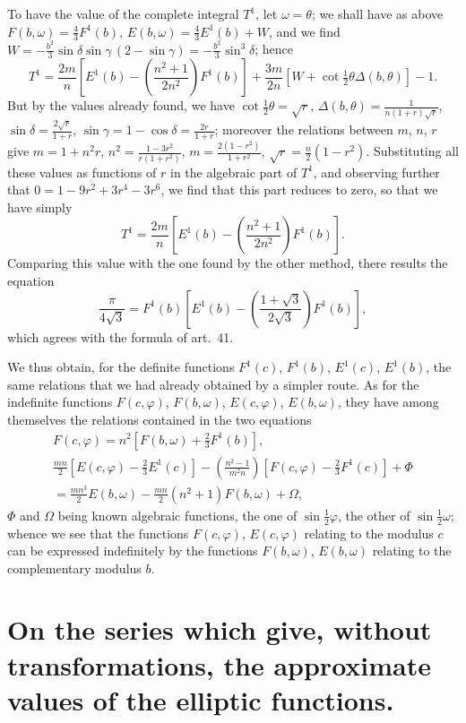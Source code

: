 \documentclass{article}
\begin{document}
To have the value of the complete integral $T^{1}$, let $\omega=\theta$; we shall have as above $F(b,\omega)=\frac{4}{3}F^{1}(b)$, $E(b,\omega)=\frac{4}{3}E^{1}(b)+W$, and we find $W=-\frac{b^{2}}{3}\sin\delta\sin\gamma\,(2-\sin\gamma)=-\frac{b^{2}}{3}\sin^{3}\delta$; hence
\[ T^{1}=\frac{2m}{n}\left[E^{1}(b)-\left(\frac{n^{2}+1}{2n^{2}}\right)F^{1}(b)\right]+\frac{3m}{2n}[W+\cot\tfrac{1}{2}\theta\Delta(b,\theta)]-1. \]
But by the values already found, we have $\cot\frac{1}{2}\theta=\sqrt{r}$, $\Delta(b,\theta)=\frac{1}{n(1+r)\sqrt{r}}$, $\sin\delta=\frac{2\sqrt{r}}{1+r}$, $\sin\gamma=1-\cos\delta=\frac{2r}{1+r}$; moreover the relations between $m$, $n$, $r$ give $m=1+n^{2}r$, $n^{2}=\frac{1-3r^{2}}{r(1+r^{2})}$, $m=\frac{2(1-r^{2})}{1+r^{2}}$, $\sqrt{r}=\frac{n}{2}(1-r^{2})$. Substituting all these values as functions of $r$ in the algebraic part of $T^{1}$, and observing further that $0=1-9r^{2}+3r^{4}-3r^{6}$, we find that this part reduces to zero, so that we have simply
\[ T^{1}=\frac{2m}{n}\left[E^{1}(b)-\left(\frac{n^{2}+1}{2n^{2}}\right)F^{1}(b)\right]. \]
Comparing this value with the one found by the other method, there results the equation
\[ \frac{\pi}{4\sqrt{3}}=F^{1}(b)\left[E^{1}(b)-\left(\frac{1+\sqrt{3}}{2\sqrt{3}}\right)F^{1}(b)\right], \]
which agrees with the formula of art.\ 41.


We thus obtain, for the definite functions $F^{1}(c)$, $F^{1}(b)$, $E^{1}(c)$, $E^{1}(b)$, the same relations that we had already obtained by a simpler route. As for the indefinite functions $F(c,\varphi)$, $F(b,\omega)$, $E(c,\varphi)$, $E(b,\omega)$, they have among themselves the relations contained in the two equations
\[ \begin{gathered} F(c,\varphi)=n^{2}[F(b,\omega)+\tfrac{2}{3}F^{1}(b)],\\ \frac{mn}{2}[E(c,\varphi)-\tfrac{2}{3}E^{1}(c)]-\left(\frac{n^{2}-1}{m^{2}n}\right)[F(c,\varphi)-\tfrac{2}{3}F^{1}(c)]+\Phi\\ =\frac{mn^{3}}{2}E(b,\omega)-\frac{mn}{2}(n^{2}+1)F(b,\omega)+\Omega, \end{gathered} \]
$\Phi$ and $\Omega$ being known algebraic functions, the one of $\sin\frac{1}{2}\varphi$, the other of $\sin\frac{1}{2}\omega$; whence we see that the functions $F(c,\varphi)$, $E(c,\varphi)$ relating to the modulus $c$ can be expressed indefinitely by the functions $F(b,\omega)$, $E(b,\omega)$ relating to the complementary modulus $b$.

\section*{On the series which give, without transformations, the approximate values of the elliptic functions.}
\end{document}
